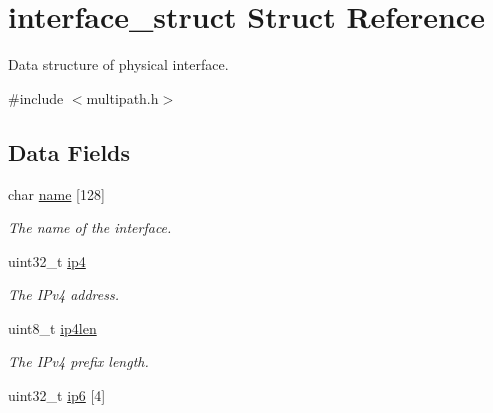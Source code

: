 \hypertarget{structinterface__struct}{\section{interface\-\_\-struct Struct Reference}
\label{structinterface__struct}
}


Data structure of physical interface.  




{\ttfamily \#include $<$multipath.\-h$>$}

\subsection*{Data Fields}
\begin{DoxyCompactItemize}
\item 
\hypertarget{structinterface__struct_a93a4209b66c75fd711969ba8dcd926f5}{char \hyperlink{structinterface__struct_a93a4209b66c75fd711969ba8dcd926f5}{name} \mbox{[}128\mbox{]}}\label{structinterface__struct_a93a4209b66c75fd711969ba8dcd926f5}

\begin{DoxyCompactList}\small\item\em The name of the interface. \end{DoxyCompactList}\item 
\hypertarget{structinterface__struct_ab2ac0561b28e2a78f94b37ca5a3b2279}{uint32\-\_\-t \hyperlink{structinterface__struct_ab2ac0561b28e2a78f94b37ca5a3b2279}{ip4}}\label{structinterface__struct_ab2ac0561b28e2a78f94b37ca5a3b2279}

\begin{DoxyCompactList}\small\item\em The I\-Pv4 address. \end{DoxyCompactList}\item 
\hypertarget{structinterface__struct_a0f0fd0028bfdc92a372046b0bd83358b}{uint8\-\_\-t \hyperlink{structinterface__struct_a0f0fd0028bfdc92a372046b0bd83358b}{ip4len}}\label{structinterface__struct_a0f0fd0028bfdc92a372046b0bd83358b}

\begin{DoxyCompactList}\small\item\em The I\-Pv4 prefix length. \end{DoxyCompactList}\item 
\hypertarget{structinterface__struct_a1a248d3cc4f3696ae959241b18e3ca5a}{uint32\-\_\-t \hyperlink{structinterface__struct_a1a248d3cc4f3696ae959241b18e3ca5a}{ip6} \mbox{[}4\mbox{]}}\label{structinterface__struct_a1a248d3cc4f3696ae959241b18e3ca5a}


\end{DoxyCompactItemize}
